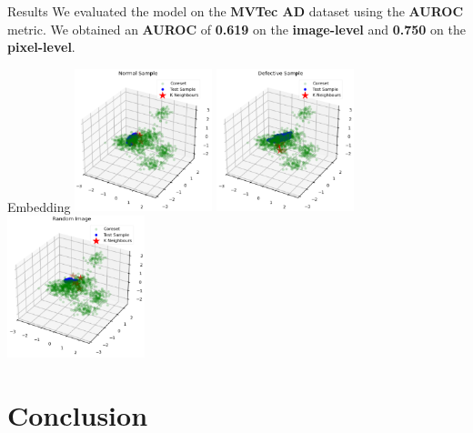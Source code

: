 \documentclass{beamer}
\begin{document}
\begin{frame}{Results}
      We evaluated the model on the \textbf{MVTec AD}\cite{mvtecad} dataset using the \textbf{AUROC} metric.
      We obtained an \textbf{AUROC} of \textbf{0.619} on the \textbf{image-level} and \textbf{0.750} 
      on the \textbf{pixel-level}.
\end{frame}
\begin{frame}{Embedding}
    \centering
    \includegraphics[width=0.3\textwidth]{assets/normal_samples_emb.png}
    \hspace{0.03\textwidth}
    \includegraphics[width=0.3\textwidth]{assets/def_sample_emb.png}
    \hspace{0.03\textwidth}
    \includegraphics[width=0.3\textwidth]{assets/rand_img_emb.png}

\end{frame}
\section{Conclusion}
\end{document}
